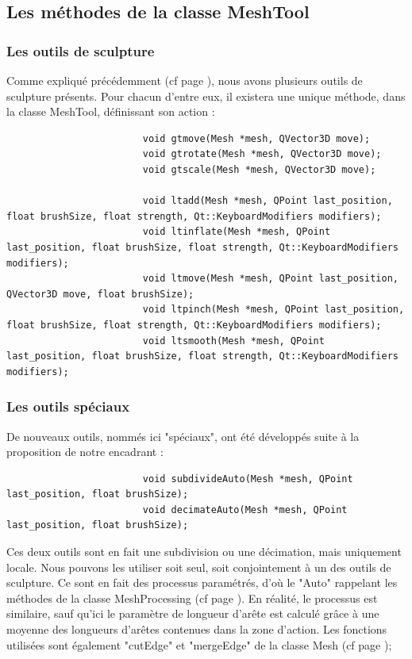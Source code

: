 \documentclass[a4paper]{memoir}
\begin{document}
			\subsection{Les méthodes de la classe MeshTool}
				\label{tool-dev}
				\subsubsection{Les outils de sculpture}
					Comme expliqué précédemment (cf page \pageref{tool-cdc}), nous avons plusieurs outils de sculpture présents. Pour chacun d'entre eux, 
					il existera une unique méthode, dans la classe MeshTool, définissant son action :
					\begin{verbatim}
						void gtmove(Mesh *mesh, QVector3D move);
						void gtrotate(Mesh *mesh, QVector3D move);
						void gtscale(Mesh *mesh, QVector3D move);

						void ltadd(Mesh *mesh, QPoint last_position, float brushSize, float strength, Qt::KeyboardModifiers modifiers);
						void ltinflate(Mesh *mesh, QPoint last_position, float brushSize, float strength, Qt::KeyboardModifiers modifiers);
						void ltmove(Mesh *mesh, QPoint last_position, QVector3D move, float brushSize);
						void ltpinch(Mesh *mesh, QPoint last_position, float brushSize, float strength, Qt::KeyboardModifiers modifiers);
						void ltsmooth(Mesh *mesh, QPoint last_position, float brushSize, float strength, Qt::KeyboardModifiers modifiers);
					\end{verbatim}
					
				\subsubsection{Les outils spéciaux}
					De nouveaux outils, nommés ici "spéciaux", ont été développés suite à la proposition de notre encadrant :
					\begin{verbatim}
						void subdivideAuto(Mesh *mesh, QPoint last_position, float brushSize);
						void decimateAuto(Mesh *mesh, QPoint last_position, float brushSize);
					\end{verbatim}
					Ces deux outils sont en fait une subdivision ou une décimation, mais uniquement locale. Nous pouvons les utiliser soit seul, soit 
					conjointement à un des outils de sculpture. Ce sont en fait des processus paramétrés, d'où le "Auto" rappelant les méthodes de la classe 
					MeshProcessing (cf page \pageref{processing-dev}). En réalité, le processus est similaire, sauf qu'ici le paramètre de longueur d'arête 
					est calculé grâce à une moyenne des longueurs d'arêtes contenues dans la zone d'action. Les fonctions utilisées sont également "cutEdge" 
					et "mergeEdge" de la classe Mesh (cf page \pageref{mesh-dev});
				
\end{document}
